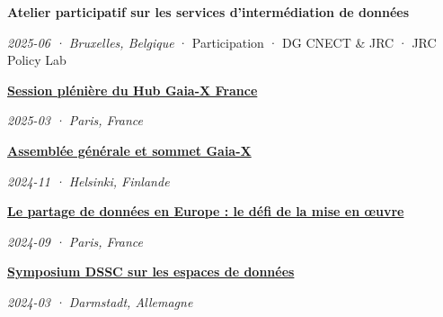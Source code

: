 \documentclass[11pt,a4paper]{article}
\newlength{\cvindent}
\newenvironment{cvblock}[1][1]{%
  \par\noindent\hspace*{#1\cvindent}%
  \begin{minipage}{\dimexpr\linewidth-#1\cvindent\relax}%
}{%
  \end{minipage}\par
}
\newenvironment{cvdetails}{%
  \begin{list}{}{%
    \setlength{\leftmargin}{\cvindent}%
    \setlength{\rightmargin}{0pt}%
    \setlength{\topsep}{0.1em}%
    \setlength{\partopsep}{0pt}%
    \setlength{\parsep}{0.05em}%
    \setlength{\itemsep}{0pt}%
  }\item[]\small\ignorespaces
}{%
  \end{list}
}
\begin{document}
\begin{cvblock}[2]
\textbf{Atelier participatif sur les services d'intermédiation de données}\par
\begin{cvdetails}
{\small\itshape 2025-06 · Bruxelles, Belgique} · Participation · DG CNECT \& JRC · JRC Policy Lab\par
\end{cvdetails}
\end{cvblock}\par\vspace{0.35em}

\begin{cvblock}[2]
\textbf{\href{https://www.gaia-x-hub.fr/retour-sur-la-7e-pleniere-du-hub-france-24-mars-2025-a-bercy/}{Session plénière du Hub Gaia-X France}}\par
\begin{cvdetails}
{\small\itshape 2025-03 · Paris, France}\par
\end{cvdetails}
\end{cvblock}\par\vspace{0.35em}

\begin{cvblock}[2]
\textbf{\href{https://gaia-x.eu/summit-2024/}{Assemblée générale et sommet Gaia-X}}\par
\begin{cvdetails}
{\small\itshape 2024-11 · Helsinki, Finlande}\par
\end{cvdetails}
\end{cvblock}\par\vspace{0.35em}

\begin{cvblock}[2]
\textbf{\href{https://chairgovreg.fondation-dauphine.fr/en/publication/1809/synthesis-data-sharing-europe-implementation-challenge}{Le partage de données en Europe : le défi de la mise en œuvre}}\par
\begin{cvdetails}
{\small\itshape 2024-09 · Paris, France}\par
\end{cvdetails}
\end{cvblock}\par\vspace{0.35em}

\begin{cvblock}[2]
\textbf{\href{https://www.data-spaces-symposium.eu/program-2024}{Symposium DSSC sur les espaces de données}}\par
\begin{cvdetails}
{\small\itshape 2024-03 · Darmstadt, Allemagne}\par
\end{cvdetails}
\end{cvblock}\par\vspace{0.35em}
\end{document}
